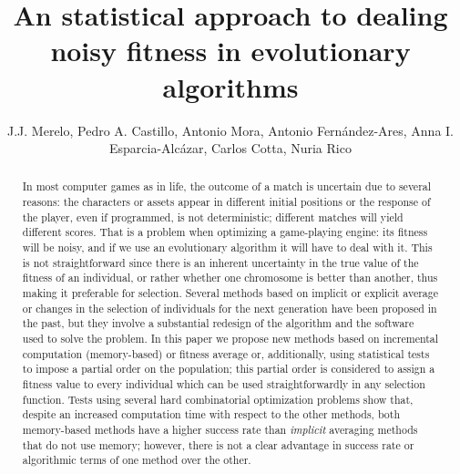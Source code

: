 \documentclass{llncs}
\begin{document}
\title{An statistical approach to dealing noisy fitness in evolutionary algorithms}

\author{J.J. Merelo, Pedro A. Castillo, Antonio
  Mora, Antonio Fernández-Ares, Anna
  I. Esparcia-Alcázar, Carlos Cotta, Nuria
  Rico}

\maketitle

\begin{abstract}
In most computer games as in life, the outcome of a match is uncertain due
  to several reasons: the characters or assets appear in different initial
  positions or the response of the player, even if programmed, is not
  deterministic; different matches will yield different scores. That is a
  problem when optimizing a game-playing engine: its fitness will be
  noisy, and if we use an evolutionary algorithm it will have to deal
  with it. This is not straightforward since there is an inherent
uncertainty in the true value of the fitness of an individual, or
rather whether one chromosome is better than another, thus making it preferable for selection.
Several methods based on implicit or explicit average or
changes in the selection of individuals for the next generation have been proposed in the past, 
but they involve a substantial redesign of the algorithm and the
software used to solve the problem. In this paper we propose  new
methods based on incremental computation (memory-based) or fitness average or, additionally, using
statistical tests to impose a partial order on the population; this
partial order is considered to assign a fitness value to every individual
which can be used straightforwardly in any selection function. 
Tests using several
hard combinatorial optimization problems show that, despite
an increased computation time with respect to the other methods, both memory-based methods have a higher
success rate than {\em implicit} averaging methods that do not use
memory; however, there is not a clear advantage in success rate or
algorithmic terms of one method over the other. 

\end{abstract}
\end{document}
